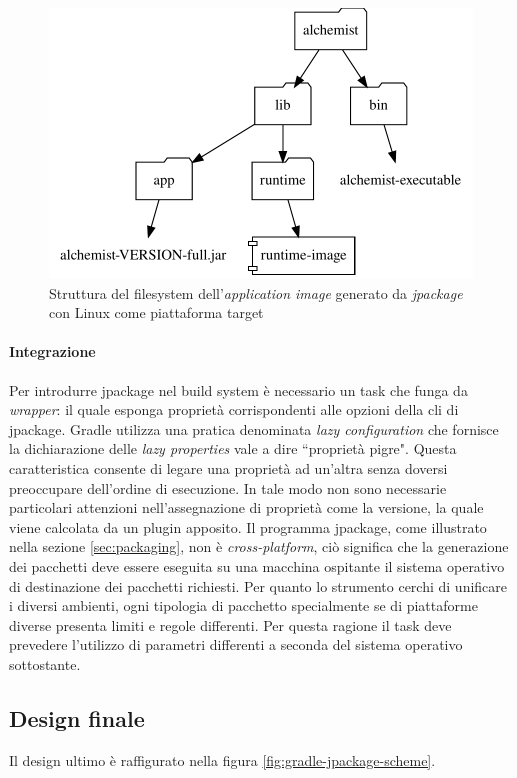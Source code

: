 \begin{figure}
	\centering
	\includegraphics[width=.7\linewidth]{figures/application-image-folder-structure.pdf}
	\caption{Struttura del filesystem dell'\textit{application image} generato da \textit{jpackage} con Linux come piattaforma target}
	\label{fig:application-image-folder-structure}
\end{figure}

\paragraph{Integrazione} Per introdurre jpackage nel build system è necessario un task che funga da \textit{wrapper}: il quale esponga proprietà corrispondenti alle opzioni della \ac{cli} di jpackage. Gradle utilizza una pratica denominata \textit{lazy configuration} che fornisce la dichiarazione delle \textit{lazy properties} vale a dire ``proprietà pigre". Questa caratteristica consente di legare una proprietà ad un'altra senza doversi preoccupare dell'ordine di esecuzione. In tale modo non sono necessarie particolari attenzioni nell'assegnazione di proprietà come la versione, la quale viene calcolata da un plugin apposito. Il programma jpackage, come illustrato nella sezione \ref{sec:packaging}, non è \textit{cross-platform}, ciò significa che la generazione dei pacchetti deve essere eseguita su una macchina ospitante il sistema operativo di destinazione dei pacchetti richiesti. Per quanto lo strumento cerchi di unificare i diversi ambienti, ogni tipologia di pacchetto specialmente se di piattaforme diverse presenta limiti e regole differenti. Per questa ragione il task deve prevedere l'utilizzo di parametri differenti a seconda del sistema operativo sottostante.

\subsection{Design finale} Il design ultimo è raffigurato nella figura \ref{fig:gradle-jpackage-scheme}. 

